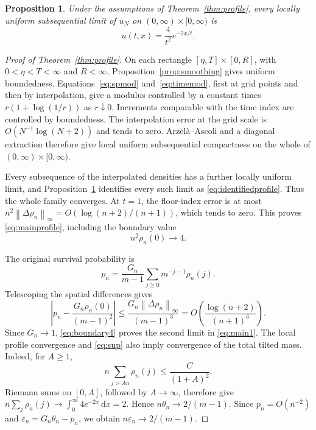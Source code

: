 \documentclass[11pt,letterpaper,reqno]{amsart}
\theoremstyle{plain}
\newtheorem{proposition}[theorem]{Proposition}
\newcommand{\dd}{\,\mathrm d}
\newcommand{\norm}[1]{\left\lVert#1\right\rVert}
\begin{document}
\begin{proposition}\label{prop:identification}
Under the assumptions of Theorem~\ref{thm:profile}, every locally uniform subsequential limit of $u_N$ on $(0,\infty)\times[0,\infty)$ is
\begin{equation}\label{eq:identifiedprofile}
 u(t,x)=\frac4{t^2}e^{-2x/t}.
\end{equation}
\end{proposition}

\begin{proof}[Proof of Theorem~\ref{thm:profile}]
On each rectangle $[\eta,T]\times[0,R]$, with $0<\eta<T<\infty$ and $R<\infty$, Proposition~\ref{prop:smoothing} gives uniform boundedness. Equations~\eqref{eq:spmod} and~\eqref{eq:timemod}, first at grid points and then by interpolation, give a modulus controlled by a constant times $r(1+\log(1/r))$ as $r\downarrow0$. Increments comparable with the time index are controlled by boundedness. The interpolation error at the grid scale is $O(N^{-1}\log(N+2))$ and tends to zero. Arzel\`a--Ascoli and a diagonal extraction therefore give local uniform subsequential compactness on the whole of $(0,\infty)\times[0,\infty)$.

Every subsequence of the interpolated densities has a further locally uniform limit, and Proposition~\ref{prop:identification} identifies every such limit as \eqref{eq:identifiedprofile}. Thus the whole family converges. At $t=1$, the floor-index error is at most
$n^2\norm{\Delta\rho_n}_\infty=O(\log(n+2)/(n+1))$, which tends to zero. This proves \eqref{eq:mainprofile}, including the boundary value
\begin{equation}\label{eq:boundary4}
 n^2\rho_n(0)\longrightarrow4.
\end{equation}

The original survival probability is
\begin{equation}\label{eq:survivalread}
 p_n=\frac{G_n}{m-1}\sum_{j\ge0}m^{-j-1}\rho_n(j).
\end{equation}
Telescoping the spatial differences gives
\[
 \left|p_n-\frac{G_n\rho_n(0)}{(m-1)^2}\right|
 \le\frac{G_n\norm{\Delta\rho_n}_\infty}{(m-1)^3}
 =O\left(\frac{\log(n+2)}{(n+1)^3}\right).
\]
Since $G_n\to1$, \eqref{eq:boundary4} proves the second limit in \eqref{eq:main1}. 
The local profile convergence and \eqref{eq:sup} also imply convergence of the total tilted mass. Indeed, for $A\ge1$,
\[
 n\sum_{j>An}\rho_n(j)\le \frac{C}{(1+A)^2}.
\]
Riemann sums on $[0,A]$, followed by $A\to\infty$, therefore give
$n\sum_j\rho_n(j)\to\int_0^\infty4e^{-2x}\dd x=2$. Hence $n\theta_n\to2/(m-1)$. Since $p_n=O(n^{-2})$ and $\varepsilon_n=G_n\theta_n-p_n$, we obtain $n\varepsilon_n\to2/(m-1)$.


\end{proof}
\end{document}
